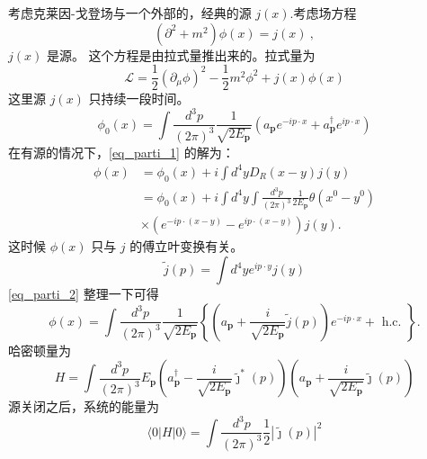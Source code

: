 
考虑克莱因-戈登场与一个外部的，经典的源 $j(x)$.考虑场方程
\begin{equation}\label{eq_parti_1}
(\partial^2+m^2)\phi(x) = j(x)~,
\end{equation}
$j(x)$ 是源。 这个方程是由拉式量推出来的。拉式量为
\begin{equation}
\mathcal L = \frac{1}{2} (\partial_\mu\phi)^2 - \frac{1}{2} m^2 \phi^2 + j(x) \phi(x)
\end{equation}
这里源 $j(x)$ 只持续一段时间。
\begin{equation}
\phi_{0}(x)=\int \frac{d^{3} p}{(2 \pi)^{3}} \frac{1}{\sqrt{2 E_{\mathbf{p}}}}\left(a_{\mathbf{p}} e^{-i p \cdot x}+a_{\mathbf{p}}^{\dagger} e^{i p \cdot x}\right)
\end{equation}
在有源的情况下，\autoref{eq_parti_1} 的解为：
\begin{equation}\label{eq_parti_2}
\begin{aligned}
\phi(x) & =\phi_{0}(x)+i \int d^{4} y D_{R}(x-y) j(y) \\
& =\phi_{0}(x)+i \int d^{4} y \int \frac{d^{3} p}{(2 \pi)^{3}} \frac{1}{2 E_{\mathbf{p}}} \theta\left(x^{0}-y^{0}\right) \\
& \times\left(e^{-i p \cdot(x-y)}-e^{i p \cdot(x-y)}\right) j(y) .
\end{aligned}
\end{equation}
这时候 $\phi(x)$ 只与 $j$ 的傅立叶变换有关。
\begin{equation}
\tilde j (p) = \int d^4 y e^{ip \cdot y} j(y)
\end{equation}
\autoref{eq_parti_2} 整理一下可得
\begin{equation}
\phi(x)=\int \frac{d^{3} p}{(2 \pi)^{3}} \frac{1}{\sqrt{2 E_{\mathbf{p}}}}\left\{\left(a_{\mathbf{p}}+\frac{i}{\sqrt{2 E_{\mathbf{p}}}} \tilde{j}(p)\right) e^{-i p \cdot x}+\text { h.c. }\right\} .
\end{equation}
哈密顿量为
\begin{equation}
H=\int \frac{d^{3} p}{(2 \pi)^{3}} E_{\mathbf{p}}\left(a_{\mathbf{p}}^{\dagger}-\frac{i}{\sqrt{2 E_{\mathbf{p}}}} \tilde{\jmath}^{*}(p)\right)\left(a_{\mathbf{p}}+\frac{i}{\sqrt{2 E_{\mathbf{p}}}} \tilde{\jmath}(p)\right)
\end{equation}
源关闭之后，系统的能量为
\begin{equation}
\langle 0|H| 0\rangle=\int \frac{d^{3} p}{(2 \pi)^{3}} \frac{1}{2}|\tilde{\jmath}(p)|^{2}
\end{equation}


